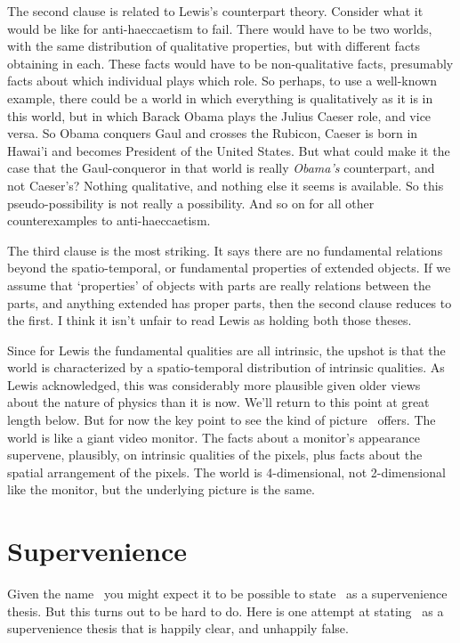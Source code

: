 The second clause is related to Lewis's counterpart theory. Consider what it would be like for anti-haeccaetism to fail. There would have to be two worlds, with the same distribution of qualitative properties, but with different facts obtaining in each. These facts would have to be non-qualitative facts, presumably facts about which individual plays which role. So perhaps, to use a well-known example, there could be a world in which everything is qualitatively as it is in this world, but in which Barack Obama plays the Julius Caeser role, and vice versa. So Obama conquers Gaul and crosses the Rubicon, Caeser is born in Hawai'i and becomes President of the United States. But what could make it the case that the Gaul-conqueror in that world is really \textit{Obama's} counterpart, and not Caeser's? Nothing qualitative, and nothing else it seems is available. So this pseudo-possibility is not really a possibility. And so on for all other counterexamples to anti-haeccaetism.

The third clause is the most striking. It says there are no fundamental relations beyond the spatio-temporal, or fundamental properties of extended objects. If we assume that `properties' of objects with parts are really relations between the parts, and anything extended has proper parts, then the second clause reduces to the first. I think it isn't unfair to read Lewis as holding both those theses.

Since for Lewis the fundamental qualities are all intrinsic, the upshot is that the world is characterized by a spatio-temporal distribution of intrinsic qualities. As Lewis acknowledged, this was considerably more plausible given older views about the nature of physics than it is now. We'll return to this point at great length below. But for now the key point to see the kind of picture \HS\ offers. The world is like a giant video monitor. The facts about a monitor's appearance supervene, plausibly, on intrinsic qualities of the pixels, plus facts about the spatial arrangement of the pixels. The world is 4-dimensional, not 2-dimensional like the monitor, but the underlying picture is the same.

\section{Supervenience}

Given the name \HS\, you might expect it to be possible to state \HS\ as a supervenience thesis. But this turns out to be hard to do. Here is one attempt at stating \HS\ as a supervenience thesis that is happily clear, and unhappily false.

